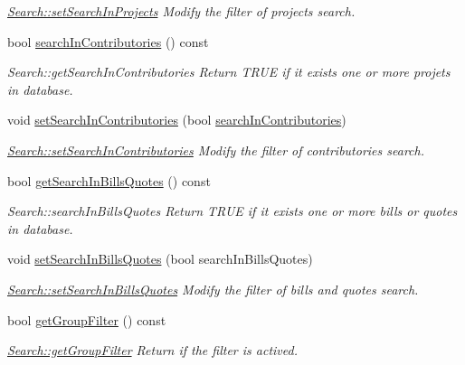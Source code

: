 \begin{DoxyCompactItemize}
\begin{DoxyCompactList}\small\item\em \hyperlink{classModels_1_1Search_ab84375da3e302c7a871b4ced1c8d69c3}{Search\-::set\-Search\-In\-Projects} Modify the filter of projects search. \end{DoxyCompactList}\item 
bool \hyperlink{classModels_1_1Search_ab799572f484cc01a515b36ea3723ee06}{search\-In\-Contributories} () const 
\begin{DoxyCompactList}\small\item\em Search\-::get\-Search\-In\-Contributories Return T\-R\-U\-E if it exists one or more projets in database. \end{DoxyCompactList}\item 
void \hyperlink{classModels_1_1Search_af6305e66a5ca5ad5ba29b15397821e58}{set\-Search\-In\-Contributories} (bool \hyperlink{classModels_1_1Search_ab799572f484cc01a515b36ea3723ee06}{search\-In\-Contributories})
\begin{DoxyCompactList}\small\item\em \hyperlink{classModels_1_1Search_af6305e66a5ca5ad5ba29b15397821e58}{Search\-::set\-Search\-In\-Contributories} Modify the filter of contributories search. \end{DoxyCompactList}\item 
bool \hyperlink{classModels_1_1Search_adf4525d5961793999c191e010a58bb56}{get\-Search\-In\-Bills\-Quotes} () const 
\begin{DoxyCompactList}\small\item\em Search\-::search\-In\-Bills\-Quotes Return T\-R\-U\-E if it exists one or more bills or quotes in database. \end{DoxyCompactList}\item 
void \hyperlink{classModels_1_1Search_a64f82cec524c9bb737e2758445288b43}{set\-Search\-In\-Bills\-Quotes} (bool search\-In\-Bills\-Quotes)
\begin{DoxyCompactList}\small\item\em \hyperlink{classModels_1_1Search_a64f82cec524c9bb737e2758445288b43}{Search\-::set\-Search\-In\-Bills\-Quotes} Modify the filter of bills and quotes search. \end{DoxyCompactList}\item 
bool \hyperlink{classModels_1_1Search_a2f5ee925709a654cedef85732e448438}{get\-Group\-Filter} () const 
\begin{DoxyCompactList}\small\item\em \hyperlink{classModels_1_1Search_a2f5ee925709a654cedef85732e448438}{Search\-::get\-Group\-Filter} Return if the filter is actived. \end{DoxyCompactList}\item 

\end{DoxyCompactItemize}
